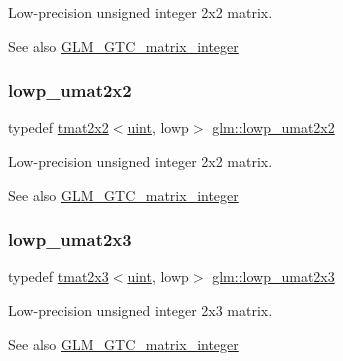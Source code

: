 Low-\/precision unsigned integer 2x2 matrix. \begin{DoxySeeAlso}{See also}
\hyperlink{group__gtc__matrix__integer}{G\+L\+M\+\_\+\+G\+T\+C\+\_\+matrix\+\_\+integer} 
\end{DoxySeeAlso}
\mbox{\label{group__gtc__matrix__integer_ga13b2812e9b0af47e0f498391383d145a}} 
\subsubsection{\texorpdfstring{lowp\+\_\+umat2x2}{lowp\_umat2x2}}
{\footnotesize\ttfamily typedef \hyperlink{structglm_1_1tmat2x2}{tmat2x2}$<$\hyperlink{group__core__precision_ga4fd29415871152bfb5abd588334147c8}{uint}, lowp$>$ \hyperlink{group__gtc__matrix__integer_ga13b2812e9b0af47e0f498391383d145a}{glm\+::lowp\+\_\+umat2x2}}

Low-\/precision unsigned integer 2x2 matrix. \begin{DoxySeeAlso}{See also}
\hyperlink{group__gtc__matrix__integer}{G\+L\+M\+\_\+\+G\+T\+C\+\_\+matrix\+\_\+integer} 
\end{DoxySeeAlso}
\mbox{\label{group__gtc__matrix__integer_ga3af254ecb450000314422b1730afacc0}} 
\subsubsection{\texorpdfstring{lowp\+\_\+umat2x3}{lowp\_umat2x3}}
{\footnotesize\ttfamily typedef \hyperlink{structglm_1_1tmat2x3}{tmat2x3}$<$\hyperlink{group__core__precision_ga4fd29415871152bfb5abd588334147c8}{uint}, lowp$>$ \hyperlink{group__gtc__matrix__integer_ga3af254ecb450000314422b1730afacc0}{glm\+::lowp\+\_\+umat2x3}}

Low-\/precision unsigned integer 2x3 matrix. \begin{DoxySeeAlso}{See also}
\hyperlink{group__gtc__matrix__integer}{G\+L\+M\+\_\+\+G\+T\+C\+\_\+matrix\+\_\+integer} 
\end{DoxySeeAlso}
\mbox{\label{group__gtc__matrix__integer_gad5e8f08c103d5dd33767e31938357aa6}} 
